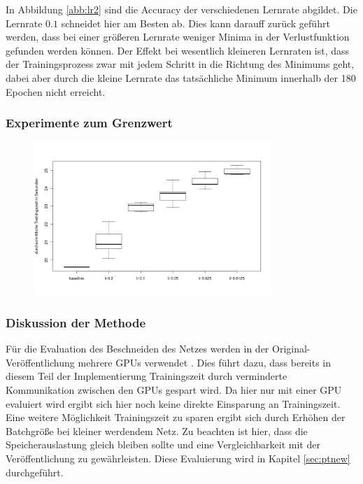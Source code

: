  In Abbildung \ref{abb:lr2} sind die Accuracy der verschiedenen Lernrate abgildet. Die Lernrate $0.1$ schneidet hier am Besten ab. Dies kann darauff zurück geführt werden, dass bei einer größeren Lernrate weniger Minima in der Verlustfunktion gefunden werden können. Der Effekt bei wesentlich kleineren Lernraten ist, dass der Trainingsprozess zwar mit jedem Schritt in die Richtung des Minimums geht, dabei aber durch die kleine Lernrate das tatsächliche Minimum innerhalb der 180 Epochen nicht erreicht.
 
 
 
 \subsubsection{Experimente zum Grenzwert}


\begin{figure}[h]
 \centering
 \includegraphics[width=0.8\textwidth]{KapitelPartB/Images/lr1.png}
 \label{ref:lra}
\end{figure}



 

\subsubsection{Diskussion der Methode}
\color{blue1}
Für die Evaluation des Beschneiden des Netzes werden in der Original-Veröffentlichung mehrere GPUs verwendet \cite{prunetrain}. Dies führt dazu, dass bereits in diesem Teil der Implementierung Trainingszeit durch verminderte Kommunikation zwischen den GPUs gespart wird. Da hier nur mit einer GPU evaluiert wird ergibt sich hier noch keine direkte Einsparung an Trainingszeit. Eine weitere Möglichkeit Trainingszeit zu sparen ergibt sich durch Erhöhen der Batchgröße bei kleiner werdendem Netz. Zu beachten ist hier, dass die Speicherauslastung gleich bleiben sollte und eine Vergleichbarkeit mit der Veröffentlichung zu gewährleisten. Diese Evaluierung wird in Kapitel \ref{sec:ptnew} durchgeführt.


